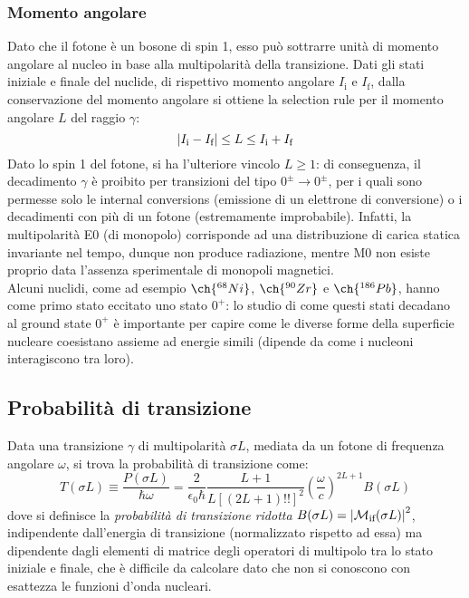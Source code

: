 \subsubsection{Momento angolare}

Dato che il fotone è un bosone di spin 1, esso può sottrarre unità di momento angolare al nucleo in base alla multipolarità della transizione. Dati gli stati iniziale e finale del nuclide, di rispettivo momento angolare $ I_{\text{i}} $ e $ I_{\text{f}} $, dalla conservazione del momento angolare si ottiene la selection rule per il momento angolare $ L $ del raggio $ \gamma $:
\begin{equation}
	\left\lvert I_{\text{i}} - I_{\text{f}}\right\rvert \le L \le I_{\text{i}} + I_{\text{f}}
	\label{eq:2.43}
\end{equation}
Dato lo spin 1 del fotone, si ha l'ulteriore vincolo $ L \ge 1 $: di conseguenza, il decadimento $ \gamma $ è proibito per transizioni del tipo $ 0^{\pm} \rightarrow 0^{\pm} $, per i quali sono permesse solo le internal conversions (emissione di un elettrone di conversione) o i decadimenti con più di un fotone (estremamente improbabile). Infatti, la multipolarità E0 (di monopolo) corrisponde ad una distribuzione di carica statica invariante nel tempo, dunque non produce radiazione, mentre M0 non esiste proprio data l'assenza sperimentale di monopoli magnetici.\\
Alcuni nuclidi, come ad esempio $ \ch{^{68}Ni} $, $ \ch{^{90}Zr} $ e $ \ch{^{186}Pb} $, hanno come primo stato eccitato uno stato $ 0^+ $: lo studio di come questi stati decadano al ground state $ 0^+ $ è importante per capire come le diverse forme della superficie nucleare coesistano assieme ad energie simili (dipende da come i nucleoni interagiscono tra loro).

\subsection{Probabilità di transizione}

Data una transizione $ \gamma $ di multipolarità $ \sigma L $, mediata da un fotone di frequenza angolare $ \omega $, si trova la probabilità di transizione come:
\begin{equation}
	T(\sigma L) \equiv \frac{P(\sigma L)}{\hbar \omega} = \frac{2}{\epsilon_0 \hbar} \frac{L + 1}{L [(2L + 1)!!]^2} \left( \frac{\omega}{c} \right)^{2L + 1} B(\sigma L)
	\label{eq:2.44}
\end{equation}
dove si definisce la \textit{probabilità di transizione ridotta} $ B(\sigma L) = \left\lvert\mathcal{M}_{\text{if}}(\sigma L)\right\rvert^2 $, indipendente dall'energia di transizione (normalizzato rispetto ad essa) ma dipendente dagli elementi di matrice degli operatori di multipolo tra lo stato iniziale e finale, che è difficile da calcolare dato che non si conoscono con esattezza le funzioni d'onda nucleari.

